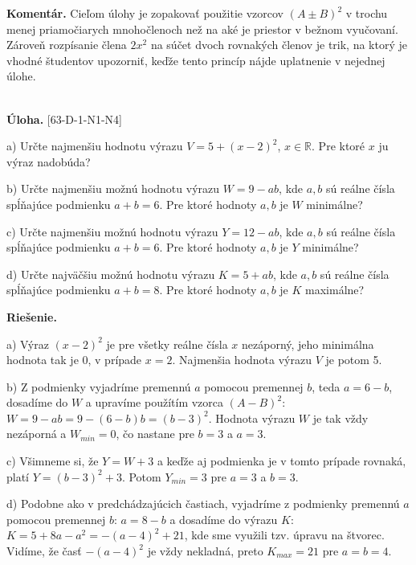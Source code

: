\documentclass[11pt,a4paper,oneside,final]{book}
\newcommand{\RR}{\mathbb{R}}
\newcommand{\kom}{\textbf{Komentár.} }
\newcommand{\ul}{\textbf{Úloha.} }
\newcommand{\rie}{\textbf{Riešenie.} }
\begin{document}
\kom Cieľom úlohy je zopakovať použitie vzorcov $(A\pm B)^2$ v trochu menej priamočia\-rych mnohočlenoch než na aké je priestor v bežnom vyučovaní. Zároveň rozpísanie člena $2x^2$ na súčet dvoch rovnakých členov je trik, na ktorý je vhodné študentov upozorniť, keďže tento princíp nájde uplatnenie v nejednej úlohe.\\
\\
\begin{tcolorbox}[breakable,notitle,boxrule=0pt,colback=light-gray,colframe=light-gray]\ul [63-D-1-N1-N4]

a) Určte najmenšiu hodnotu výrazu $V = 5 + (x - 2)^2$, $x \in \RR$. Pre ktoré $x$ ju výraz nadobúda?

b) Určte najmenšiu možnú hodnotu výrazu $W = 9 - ab$, kde $a, b$ sú reálne čísla spĺňajúce podmienku $a + b = 6$. Pre ktoré hodnoty $a, b$ je $W$ minimálne?

c) Určte najmenšiu možnú hodnotu výrazu $Y = 12-ab$, kde $a, b$ sú reálne čísla spĺňajúce podmienku $a + b = 6$. Pre ktoré hodnoty $a, b$ je $Y$ minimálne?

d) Určte najväčšiu možnú hodnotu výrazu $K = 5 + ab$, kde $a, b$ sú reálne čísla spĺňajúce podmienku $a + b = 8$. Pre ktoré hodnoty $a, b$ je $K$ maximálne?

\end{tcolorbox}

\rie

a) Výraz $(x-2)^2$ je pre všetky reálne čísla $x$ nezáporný, jeho minimálna hodnota tak je 0, v prípade $x=2$. Najmenšia hodnota výrazu $V$ je potom 5.

b) Z podmienky vyjadríme premennú $a$ pomocou premennej $b$, teda $a=6-b$, dosadíme do $W$ a upravíme použítím vzorca $(A-B)^2$: $W=9-ab=9-(6-b)b=(b-3)^2$. Hodnota výrazu $W$ je tak vždy nezáporná a $W_{min}=0$, čo nastane pre $b=3$ a $a=3$.

c) Všimneme si, že $Y=W+3$ a keďže aj podmienka je v tomto prípade rovnaká, platí $Y=(b-3)^2+3$. Potom $Y_{min}=3$ pre $a=3$ a $b=3$.

d) Podobne ako v predchádzajúcich častiach, vyjadríme z podmienky premennú $a$ pomocou premennej $b$: $a=8-b$ a dosadíme do výrazu $K$: $K = 5 + 8a - a^2= -(a - 4)^2+ 21$, kde sme využili tzv. úpravu na štvorec. Vidíme, že časť $-(a-4)^2$ je vždy nekladná, preto $K_{max}=21$ pre $a = b = 4$.\\
\end{document}
